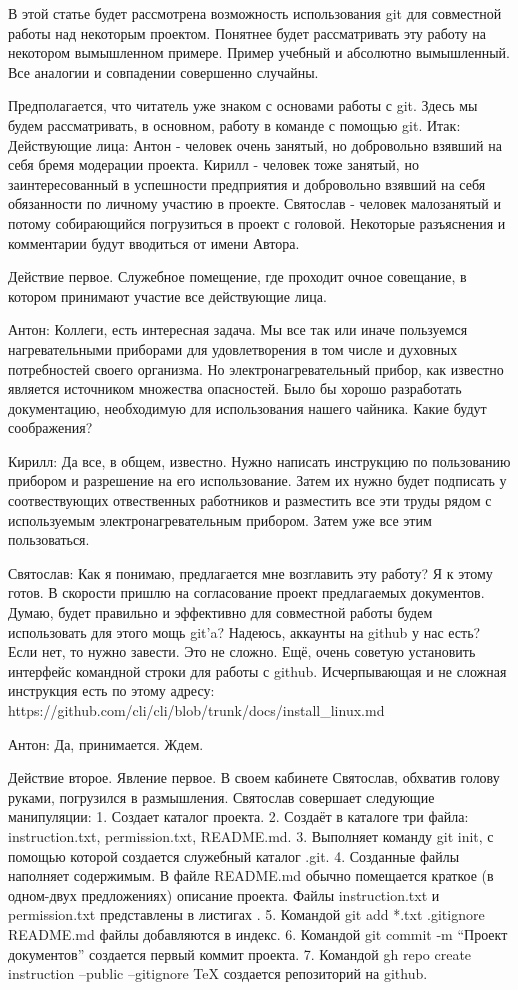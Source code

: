 \documentclass{play}
\begin{document}
В этой статье будет рассмотрена возможность использования git для совместной работы над 
некоторым проектом. Понятнее будет рассматривать эту работу на некотором вымышленном примере. 
Пример учебный и абсолютно вымышленный. Все аналогии и совпадении совершенно случайны.

Предполагается, что читатель уже знаком с основами работы с git. Здесь мы будем рассматривать,
в основном, работу в команде с помощью git.
Итак:
Действующие лица:
Антон - человек очень занятый, но добровольно взявший на себя бремя модерации проекта.
Кирилл - человек тоже занятый, но заинтересованный в успешности предприятия и добровольно
взявший на себя обязанности по личному участию в проекте.
Святослав - человек малозанятый и потому собирающийся погрузиться в проект с головой.
Некоторые разъяснения и комментарии будут вводиться от имени Автора.

Действие первое. 
Служебное помещение, где проходит очное совещание, в котором принимают участие все действующие лица.

Антон: Коллеги, есть интересная задача. Мы все так или иначе пользуемся нагревательными приборами
для удовлетворения в том числе и духовных потребностей своего организма. Но электронагревательный 
прибор, как известно является источником множества опасностей. Было бы хорошо разработать
документацию, необходимую для использования нашего чайника. Какие будут соображения?

Кирилл: Да все, в общем, известно. Нужно написать инструкцию по пользованию прибором и разрешение
на его использование. 
Затем их нужно будет подписать у соотвествующих отвественных работников и разместить все эти труды
рядом с используемым электронагревательным прибором. Затем уже все этим пользоваться. 

Святослав: Как я понимаю, предлагается мне возглавить эту работу? Я к этому готов. В скорости
пришлю на согласование проект предлагаемых документов. Думаю, будет правильно и эффективно
для совместной работы будем использовать для этого мощь git'a? Надеюсь, аккаунты на github у нас есть?
Если нет, то нужно завести. Это не сложно. Ещё, очень советую установить интерфейс командной
строки для работы с github. Исчерпывающая и не сложная инструкция есть по этому адресу:
https://github.com/cli/cli/blob/trunk/docs/install\_linux.md

Антон: Да, принимается. Ждем.

Действие второе.
Явление первое.
В своем кабинете Святослав, обхватив голову руками, погрузился в размышления.
Святослав совершает следующие манипуляции:
1. Создает каталог проекта.
2. Создаёт в каталоге три файла: instruction.txt, permission.txt, README.md.
3. Выполняет команду git init, с помощью которой создается служебный каталог .git.
4. Созданные файлы наполняет содержимым. В файле README.md обычно помещается краткое (в одном-двух
предложениях) описание проекта. Файлы instruction.txt и permission.txt представлены в листигах .
5. Командой git add *.txt .gitignore README.md файлы добавляются в индекс.
6. Командой git commit -m ``Проект документов'' создается первый коммит проекта.
7. Командой
 gh repo create instruction --public --gitignore TeX
	создается репозиторий на github.
\end{document}
